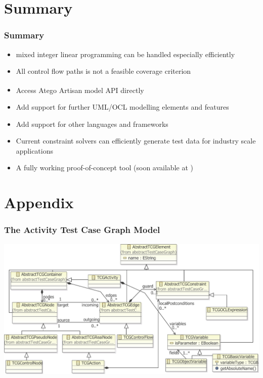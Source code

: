 \documentclass{beamer}
\begin{document}
\section{Summary}
\begin{frame}
\frametitle{Summary}
\begin{itemize}
  \item mixed integer linear programming can be handled especially efficiently
  \item All control flow paths is not a feasible coverage criterion
  \vspace{0.2cm}
  \item Access Atego\textsuperscript{\textregistered} Artisan model API directly
  \item Add support for further UML/OCL modelling elements and features
  \item Add support for other languages and frameworks
  \vspace{0.2cm}
  \item Current constraint solvers can efficiently generate test data for industry scale applications
  \item A fully working proof-of-concept tool (soon available at \cite{PartegWebsite})
\end{itemize}
\end{frame}


\section*{Appendix}

\begin{frame}
\frametitle{The Activity Test Case Graph Model}
	\includegraphics[width=\textwidth]{../IntermediatePresentation/pics/completeMetamodelforSlideshowN.pdf}
\end{frame}
\end{document}
